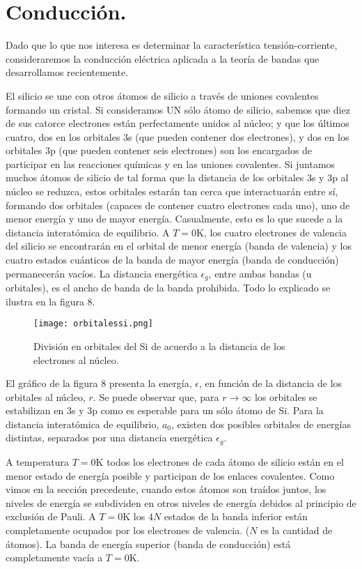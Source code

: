 \documentclass[12pt,a4paper]{article}
\begin{document}
\section{Conducción.}

Dado que lo que nos interesa es determinar la característica tensión-corriente, consideraremos la conducción eléctrica aplicada a la teoría de bandas que desarrollamos recientemente.

El silicio se une con otros átomos de silicio a través de uniones covalentes formando un cristal. Si consideramos UN sólo átomo de silicio, sabemos que diez de sus catorce electrones están perfectamente unidos al núcleo; y que los últimos cuatro, dos en los orbitales 3s (que pueden contener dos electrones), y dos en los orbitales 3p (que pueden contener seis electrones) son los encargados de participar en las reacciones químicas y en las uniones covalentes. Si juntamos muchos átomos de silicio de tal forma que la distancia de los orbitales 3s y 3p al núcleo se reduzca, estos orbitales estarán tan cerca que interactuarán entre sí, formando dos orbitales (capaces de contener cuatro electrones cada uno), uno de menor energía y uno de mayor energía. Casualmente, esto es lo que sucede a la distancia interatómica de equilibrio. A $T=0$K, los cuatro electrones de valencia del silicio se encontrarán en el orbital de menor energía (banda de valencia) y los cuatro estados cuánticos de la banda de mayor energía (banda de conducción) permanecerán vacíos. La distancia energética $\epsilon _{g}$, entre ambas bandas (u orbitales), es el ancho de banda de la banda prohibida. Todo lo explicado se ilustra en la figura 8.

\begin{figure}[ht!]
\begin{center}
\texttt{[image: orbitalessi.png]}
\caption{División en orbitales del Si de acuerdo a la distancia de los electrones al núcleo.}
\end{center}
\end{figure}

El gráfico de la figura 8 presenta la energía, $\epsilon$, en función de la distancia de los orbitales al núcleo, $r$. Se puede observar que, para $r \rightarrow \infty$ los orbitales se estabilizan en 3s y 3p como es esperable para un sólo átomo de Si. Para la distancia interatómica de equilibrio, $a_{0}$, existen dos posibles orbitales de energías distintas, separados por una distancia energética $\epsilon _{g}$.

A temperatura $T=0$K todos los electrones de cada átomo de silicio están en el menor estado de energía posible y participan de los enlaces covalentes. Como vimos en la sección precedente, cuando estos átomos son traídos juntos, los niveles de energía se subdividen en otros niveles de energía debidos al principio de exclusión de Pauli. A $T=0$K los $4N$ estados de la banda inferior están completamente ocupados por los electrones de valencia. ($N$ es la cantidad de átomos). La banda de energía superior (banda de conducción) está completamente vacía a $T=0$K.
\end{document}
